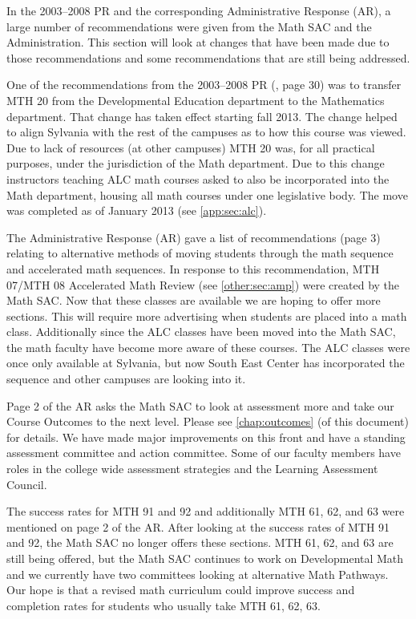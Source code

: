 In the 2003--2008 PR and the corresponding Administrative
Response (AR), a large number of recommendations were given from the Math SAC and
the Administration.  This section will look at changes that have been made due
to those recommendations and some recommendations that are still being
addressed.

One of the recommendations from the 2003--2008 PR (\cite{mathprogramreview2003}, page 30) was to transfer MTH
20 from the Developmental Education department to the Mathematics department.
That change has taken effect starting fall 2013.  The change helped to align
Sylvania with the rest of the campuses as to how this course was viewed.   Due
to lack of resources (at other campuses) MTH 20 was, for all practical purposes,
under the jurisdiction of the Math department.  Due to this change instructors
teaching ALC math courses asked to also be incorporated into the Math
department, housing all math courses under one legislative body.  The move was
completed as of January 2013 (see \vref{app:sec:alc}).

The Administrative Response (AR) gave a list of recommendations (page 3) relating to alternative methods
of moving students through the math sequence and accelerated math sequences.  In
response to this recommendation, MTH 07/MTH 08 Accelerated Math Review (see \vref{other:sec:amp}) were created by the Math SAC.
Now that these classes are available we are hoping to offer more sections.  This
will require more advertising when students are placed into a math class.
Additionally since the ALC classes have been moved into the Math SAC, the math
faculty have become more aware of these courses.  The ALC classes were once only
available at Sylvania, but now South East Center has incorporated the sequence
and other campuses are looking into it.

Page 2 of the AR asks the Math SAC to look at assessment more and take our
Course Outcomes to the next level.  Please see \vref{chap:outcomes} (of this
document) for
details.  We have made major improvements on this front and have a standing
assessment committee and action committee.  Some of our faculty members have
roles in the college wide assessment strategies and the Learning Assessment Council.

The success rates for MTH 91 and 92 and additionally MTH 61, 62, and 63 were
mentioned on page 2 of the AR.  After looking at the success rates of MTH 91 and
92, the Math SAC no longer offers these sections.   MTH 61, 62, and 63 are still
being offered, but the Math SAC continues to work on Developmental Math and we
currently have two committees looking at alternative Math Pathways. 
Our hope is that a revised math curriculum could improve success and completion rates for students who usually take MTH 61, 62, 63. 

